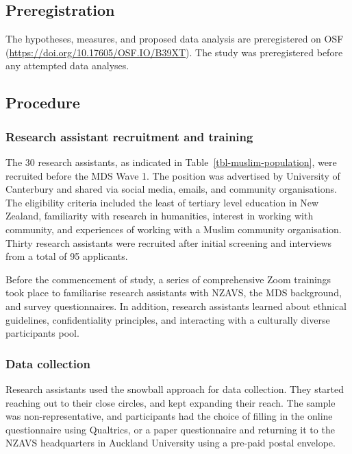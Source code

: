 \documentclass[
]{interact}
\begin{document}
\subsection{Preregistration}\label{preregistration}

The hypotheses, measures, and proposed data analysis are preregistered
on OSF (\url{https://doi.org/10.17605/OSF.IO/B39XT}). The study was
preregistered before any attempted data analyses.

\subsection{Procedure}\label{procedure}

\subsubsection{Research assistant recruitment and
training}\label{research-assistant-recruitment-and-training}

The 30 research assistants, as indicated in
Table~\ref{tbl-muslim-population}, were recruited before the MDS Wave 1.
The position was advertised by University of Canterbury and shared via
social media, emails, and community organisations. The eligibility
criteria included the least of tertiary level education in New Zealand,
familiarity with research in humanities, interest in working with
community, and experiences of working with a Muslim community
organisation. Thirty research assistants were recruited after initial
screening and interviews from a total of 95 applicants.

Before the commencement of study, a series of comprehensive Zoom
trainings took place to familiarise research assistants with NZAVS, the
MDS background, and survey questionnaires. In addition, research
assistants learned about ethnical guidelines, confidentiality
principles, and interacting with a culturally diverse participants pool.

\subsubsection{Data collection}\label{data-collection}

Research assistants used the snowball approach for data collection. They
started reaching out to their close circles, and kept expanding their
reach. The sample was non-representative, and participants had the
choice of filling in the online questionnaire using Qualtrics, or a
paper questionnaire and returning it to the NZAVS headquarters in
Auckland University using a pre-paid postal envelope.
\end{document}
